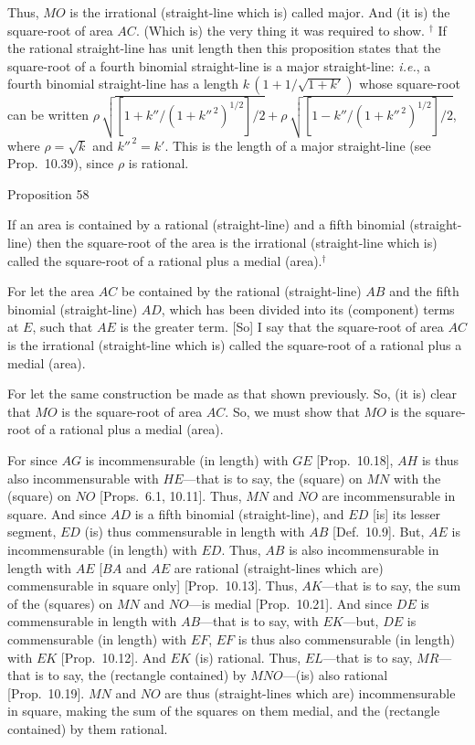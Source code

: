  Thus, $MO$ is the irrational (straight-line which is) called major.
 And (it is) the square-root of area $AC$. (Which is) the very thing it
 was required to show.
 {\footnotesize\noindent$^\dag$ If the rational straight-line has unit length then this proposition states that the square-root of 
a fourth binomial straight-line is a major straight-line: {\em i.e.}, 
a fourth binomial straight-line has a length $k\,(1+1/\sqrt{1+k'})$ whose
square-root can be written $\rho\,\sqrt{[1+k''/(1+k''^{\,2})^{1/2}]/2}+\rho\,\sqrt{[1-k''/(1+k''^{\,2})^{1/2}]/2}$, where $\rho=\sqrt{k}$ and $k''^{\,2}=k'$. This is the length of a major straight-line (see Prop.~10.39), since $\rho$ is rational.}


\begin{center}
{\large Proposition 58}
\end{center}

If an area is contained by a rational (straight-line)
and a fifth binomial (straight-line) then the square-root of the area is
the irrational (straight-line which is) called the square-root of a rational
plus a medial (area).$^\dag$

For let the area $AC$ be contained by the rational (straight-line) $AB$
and the fifth binomial (straight-line) $AD$, which has been divided into its
(component) terms at $E$, such that $AE$ is the greater term. [So] I say that
the square-root of area $AC$ is the irrational (straight-line which is)
called the square-root of a rational plus a medial (area).

\epsfysize=1.35in
\centerline{}

For let the same construction  be made as that shown previously.
So, (it is) clear that $MO$ is the square-root of area $AC$.
So, we must show that $MO$ is the square-root of a rational plus a medial
(area).

 For since $AG$ is incommensurable (in length) with $GE$ [Prop.~10.18], $AH$ is thus also
 incommensurable with $HE$---that is to say, the (square) on $MN$
 with the (square) on $NO$ [Props.~6.1, 10.11]. Thus, $MN$ and $NO$
 are incommensurable in square. And since $AD$ is a fifth
 binomial (straight-line), and $ED$ [is] its lesser segment, $ED$
 (is) thus commensurable in length with $AB$ [Def.~10.9]. But, $AE$ is incommensurable (in length) with $ED$. Thus, $AB$ is also incommensurable in length with $AE$
 [$BA$ and $AE$ are rational (straight-lines which are) commensurable
 in square only] [Prop.~10.13]. Thus, $AK$---that
 is to say, the sum of the (squares) on $MN$ and $NO$---is medial [Prop.~10.21]. And since $DE$ is
 commensurable in length with $AB$---that is to say, with $EK$---but,
 $DE$ is commensurable (in length) with $EF$, $EF$ is thus
also  commensurable (in length) with $EK$ [Prop.~10.12]. And $EK$ (is) rational. Thus, $EL$---that is to say, $MR$---that is to say, the (rectangle contained) by
$MNO$---(is) also rational [Prop.~10.19]. 
$MN$ and $NO$ are thus (straight-lines which are) incommensurable in square, making
the sum of the squares on them medial, and the (rectangle contained)
by them rational.

